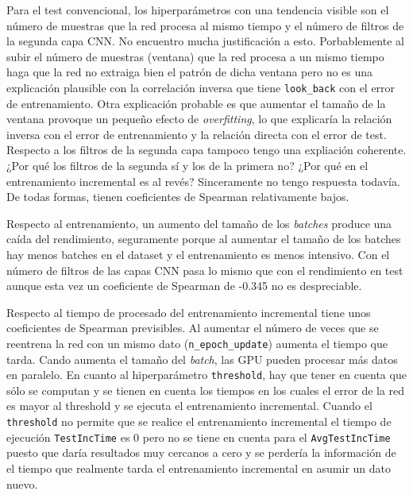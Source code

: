 \documentclass{article}
\begin{document}
Para el test convencional, los hiperparámetros con una tendencia visible son el número de muestras que la red procesa al mismo tiempo y el número de filtros de la segunda capa CNN. No encuentro mucha justificación a esto. Porbablemente al subir el número de muestras (ventana) que la red procesa a un mismo tiempo haga que la red no extraiga bien el patrón de dicha ventana pero no es una explicación plausible con la correlación inversa que tiene \texttt{look\_back} con el error de entrenamiento. Otra explicación probable es que aumentar el tamaño de la ventana provoque un pequeño efecto de \textit{overfitting}, lo que explicaría la relación inversa con el error de entrenamiento y la relación directa con el error de test. Respecto a los filtros de la segunda capa tampoco tengo una expliación coherente. ¿Por qué los filtros de la segunda sí y los de la primera no? ¿Por qué en el entrenamiento incremental es al revés? Sinceramente no tengo respuesta todavía. De todas formas, tienen coeficientes de Spearman relativamente bajos.



Respecto al entrenamiento, un aumento del tamaño de los \textit{batches} produce una caída del rendimiento, seguramente porque al aumentar el tamaño de los batches hay menos batches en el dataset y el entrenamiento es menos intensivo. Con el número de filtros de las capas CNN pasa lo mismo que con el rendimiento en test aunque esta vez un coeficiente de Spearman de -0.345 no es despreciable.

Respecto al tiempo de procesado del entrenamiento incremental tiene unos coeficientes de Spearman previsibles. Al aumentar el número de veces que se reentrena la red con un mismo dato (\texttt{n\_epoch\_update}) aumenta el tiempo que tarda. Cando aumenta el tamaño del \textit{batch}, las GPU pueden procesar más datos en paralelo. En cuanto al hiperparámetro \texttt{threshold}, hay que tener en cuenta que sólo se computan y se tienen en cuenta los tiempos en los cuales el error de la red es mayor al threshold y se ejecuta el entrenamiento incremental. Cuando el \texttt{threshold} no permite que se realice el entrenamiento incremental el tiempo de ejecución \texttt{TestIncTime} es 0 pero no se tiene en cuenta para el \texttt{AvgTestIncTime} puesto que daría resultados muy cercanos a cero y se perdería la información de el tiempo que realmente tarda el entrenamiento incremental en asumir un dato nuevo.
\end{document}
